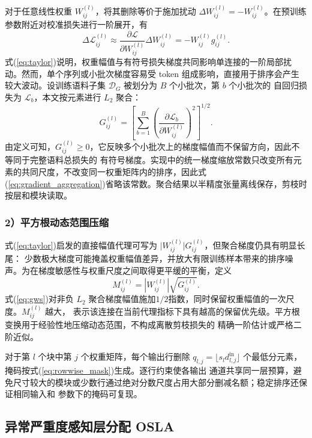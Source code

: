 \documentclass[UTF8,fontset=fandol]{ctexart}
\begin{document}
对于任意线性权重 $W_{ij}^{(l)}$，将其删除等价于施加扰动
$\Delta W_{ij}^{(l)}=-W_{ij}^{(l)}$。在预训练参数附近对校准损失进行一阶展开，有
\begin{equation}
\Delta\mathcal L_{ij}^{(l)}
\approx
\frac{\partial\mathcal L}{\partial W_{ij}^{(l)}}
\Delta W_{ij}^{(l)}
=-W_{ij}^{(l)}g_{ij}^{(l)} .
\label{eq:taylor}
\end{equation}
式(\ref{eq:taylor})说明，权重幅值与有符号损失梯度共同影响单连接的一阶局部扰动。然而，单个序列或小批次梯度容易受
token 组成影响，直接用于排序会产生较大波动。设训练语料子集 $\mathcal D_G$ 被划分为 $B$ 个小批次，第 $b$ 个小批次的
自回归损失为 $\mathcal L_b$，本文按元素进行 $L_2$ 聚合：
\begin{equation}
G_{ij}^{(l)}
=
\left[
\sum_{b=1}^{B}
\left(
\frac{\partial\mathcal L_b}{\partial W_{ij}^{(l)}}
\right)^2
\right]^{1/2}.
\label{eq:gradient_aggregation}
\end{equation}
由定义可知，$G_{ij}^{(l)}\geq0$，它反映多个小批次上的梯度幅值而不保留方向，因此不等同于完整语料总损失的
有符号梯度。实现中的统一梯度缩放常数只改变所有元素的共同尺度，不改变同一权重矩阵内的排序，因此式
(\ref{eq:gradient_aggregation})省略该常数。聚合结果以半精度张量离线保存，剪枝时按层和模块读取。

\subsubsection*{2）平方根动态范围压缩}

式(\ref{eq:taylor})启发的直接幅值代理可写为 $\lvert W_{ij}^{(l)}\rvert G_{ij}^{(l)}$，但聚合梯度仍具有明显长尾：
少数极大梯度可能掩盖权重幅值差异，并放大有限训练样本带来的排序噪声。为在梯度敏感性与权重尺度之间取得更平缓的平衡，定义
\begin{equation}
M_{ij}^{(l)}
=
\left|W_{ij}^{(l)}\right|
\sqrt{G_{ij}^{(l)}}.
\label{eq:gws}
\end{equation}
式(\ref{eq:gws})对非负 $L_2$ 聚合梯度幅值施加$1/2$指数，同时保留权重幅值的一次尺度。$M_{ij}^{(l)}$ 越大，
表示该连接在当前代理指标下具有越高的保留优先级。平方根变换用于经验性地压缩动态范围，不构成离散剪枝损失的
精确一阶估计或严格二阶近似。

对于第 $l$ 个块中第 $j$ 个权重矩阵，每个输出行删除
$q_{l,j}=\lfloor s_l d_{l,j}^{\mathrm{in}}\rfloor$ 个最低分元素，掩码按式(\ref{eq:rowwise_mask})生成。逐行约束使各输出
通道共享同一层预算，避免尺寸较大的模块或少数行通过绝对分数尺度占用大部分删减名额；稳定排序还保证相同输入和
参数下的掩码可复现。

\subsection{异常严重度感知层分配 OSLA}
\end{document}
